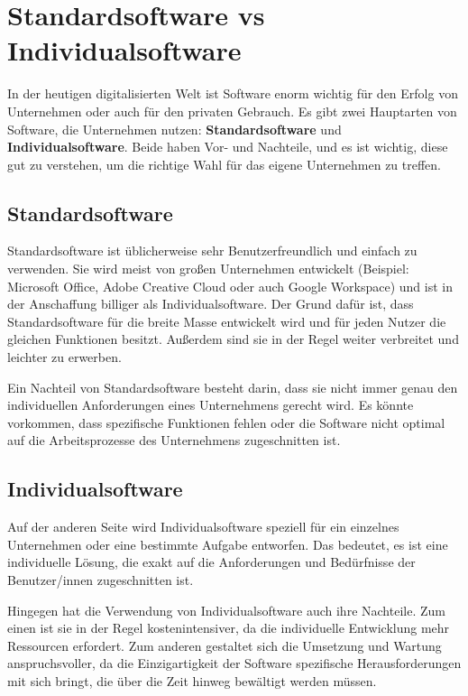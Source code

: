 \section {Standardsoftware vs Individualsoftware}

In der heutigen digitalisierten Welt ist Software enorm wichtig für den Erfolg von Unternehmen 
oder auch für den privaten Gebrauch.
Es gibt zwei Hauptarten von Software, die Unternehmen nutzen: \textbf{Standardsoftware} und 
\textbf{Individualsoftware}.
Beide haben Vor- und Nachteile, und es ist wichtig, 
diese gut zu verstehen, um die richtige Wahl für das eigene Unternehmen zu treffen.

\subsection*{Standardsoftware}

Standardsoftware ist üblicherweise sehr Benutzerfreundlich und einfach zu verwenden. 
Sie wird meist von großen Unternehmen entwickelt 
(Beispiel: Microsoft Office, Adobe Creative Cloud oder auch Google Workspace) 
und ist in der Anschaffung billiger als Individualsoftware. 
Der Grund dafür ist, dass Standardsoftware für die breite Masse entwickelt wird 
und für jeden Nutzer die gleichen Funktionen besitzt. 
Außerdem sind sie in der Regel weiter verbreitet und leichter zu erwerben.

Ein Nachteil von Standardsoftware besteht darin, dass sie nicht immer genau 
den individuellen Anforderungen eines Unternehmens gerecht wird. 
Es könnte vorkommen, dass spezifische Funktionen fehlen oder die Software 
nicht optimal auf die Arbeitsprozesse des Unternehmens zugeschnitten ist. 

\subsection*{Individualsoftware}

Auf der anderen Seite wird Individualsoftware speziell für ein einzelnes 
Unternehmen oder eine bestimmte Aufgabe entworfen. 
Das bedeutet, es ist eine individuelle Lösung, die exakt auf 
die Anforderungen und Bedürfnisse der Benutzer/innen zugeschnitten ist.

Hingegen hat die Verwendung von Individualsoftware auch ihre Nachteile. 
Zum einen ist sie in der Regel kostenintensiver, da die individuelle Entwicklung 
mehr Ressourcen erfordert. Zum anderen gestaltet sich die Umsetzung und Wartung 
anspruchsvoller, da die Einzigartigkeit der Software spezifische Herausforderungen 
mit sich bringt, die über die Zeit hinweg bewältigt werden müssen.


